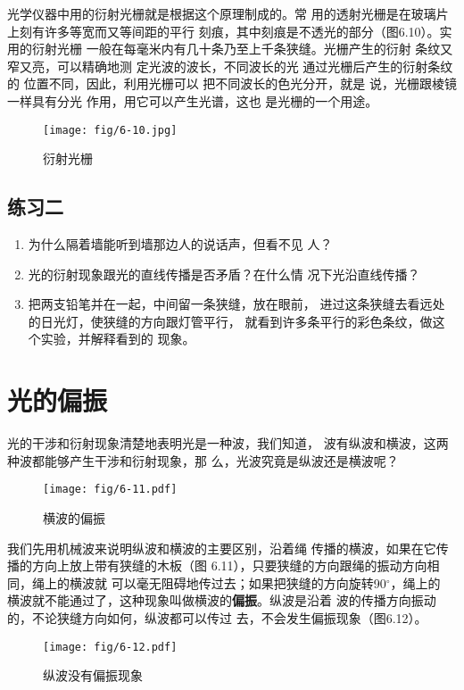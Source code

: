 光学仪器中用的衍射光栅就是根据这个原理制成的。常
用的透射光栅是在玻璃片上刻有许多等宽而又等间距的平行
刻痕，其中刻痕是不透光的部分（图6.10）。实用的衍射光栅
一般在每毫米内有几十条乃至上千条狭缝。光栅产生的衍射
条纹又窄又亮，可以精确地测
定光波的波长，不同波长的光
通过光栅后产生的衍射条纹的
位置不同，因此，利用光栅可以
把不同波长的色光分开，就是
说，光栅跟棱镜一样具有分光
作用，用它可以产生光谱，这也
是光栅的一个用途。

\begin{figure}[htp]\centering
    \texttt{[image: fig/6-10.jpg]}
    \caption{衍射光栅}
    \end{figure}

\subsection*{练习二}
\begin{enumerate}
\item 为什么隔着墙能听到墙那边人的说话声，但看不见
人？
\item 光的衍射现象跟光的直线传播是否矛盾？在什么情
况下光沿直线传播？
\item 把两支铅笔并在一起，中间留一条狭缝，放在眼前，
进过这条狭缝去看远处的日光灯，使狭缝的方向跟灯管平行，
就看到许多条平行的彩色条纹，做这个实验，并解释看到的
现象。
\end{enumerate}

\section{光的偏振}

光的干涉和衍射现象清楚地表明光是一种波，我们知道，
波有纵波和横波，这两种波都能够产生干涉和衍射现象，那
么，光波究竟是纵波还是横波呢？
\begin{figure}[htp]\centering
    \texttt{[image: fig/6-11.pdf]}
    \caption{横波的偏振}
    \end{figure}

我们先用机械波来说明纵波和横波的主要区别，沿着绳
传播的横波，如果在它传播的方向上放上带有狭缝的木板（图
6.11），只要狭缝的方向跟绳的振动方向相同，绳上的横波就
可以毫无阻碍地传过去；如果把狭缝的方向旋转90$^\circ$，绳上的
横波就不能通过了，这种现象叫做横波的\textbf{偏振}。纵波是沿着
波的传播方向振动的，不论狭缝方向如何，纵波都可以传过
去，不会发生偏振现象（图6.12）。
\begin{figure}[htp]\centering
    \texttt{[image: fig/6-12.pdf]}
    \caption{纵波没有偏振现象}
    \end{figure}

